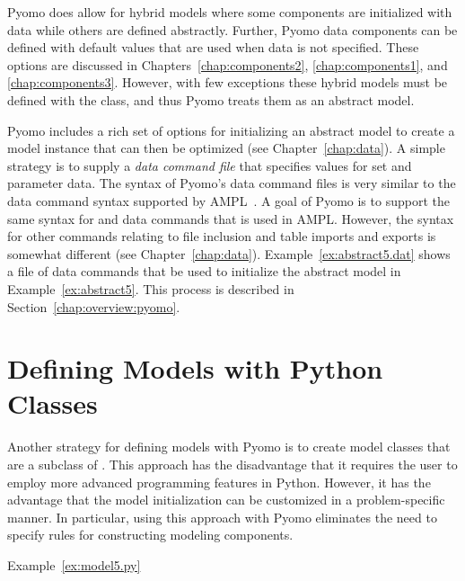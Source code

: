\begin{Xnotebox}
Pyomo does allow for hybrid models where some components are initialized
with data while others are defined abstractly.  Further, Pyomo data
components can be defined with default values that are used when data 
is not specified.  These options are discussed in Chapters~\ref{chap:components2}, \ref{chap:components1}, and \ref{chap:components3}.  However, with few exceptions these hybrid models 
must be defined with the  class, and thus Pyomo treats them 
as an abstract model.
\end{Xnotebox}

Pyomo includes a rich set of options for
initializing an abstract model to create a model instance that can then
be optimized (see Chapter~\ref{chap:data}).
A simple strategy is to supply a {\it data command file} that
specifies values for set and parameter data.
The syntax of Pyomo's data command files is very similar to the data command syntax
supported by AMPL~\cite{AMPL}.  A goal of Pyomo is to support the same
syntax for  and  data commands that is used in AMPL.
However, the syntax for other commands relating to file inclusion and table
imports and exports is somewhat different (see Chapter~\ref{chap:data}).
Example~\ref{ex:abstract5.dat} shows a file of data commands that be
used to initialize the abstract model in Example~\ref{ex:abstract5}.
This process is described in Section~\ref{chap:overview:pyomo}.



\section{Defining Models with Python Classes}

Another strategy for defining models with Pyomo is to create model classes that
are a subclass of .  This approach has the disadvantage that it requires the user to employ more advanced programming features in Python.  However, it has the advantage that the model initialization can be customized
in a problem-specific manner.  In particular, using this approach with Pyomo
eliminates the need to specify rules for constructing modeling components.

Example~\ref{ex:model5.py}
\fi



